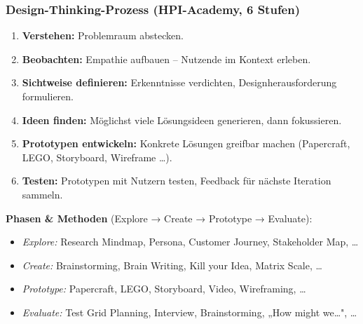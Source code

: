 \documentclass[12pt, a4paper]{article}
\begin{document}
\subsubsection*{Design-Thinking-Prozess (HPI-Academy, 6 Stufen)}

\begin{enumerate}
  \item \textbf{Verstehen:} Problemraum abstecken.
  \item \textbf{Beobachten:} Empathie aufbauen -- Nutzende im Kontext erleben.
  \item \textbf{Sichtweise definieren:} Erkenntnisse verdichten, Designherausforderung formulieren.
  \item \textbf{Ideen finden:} Möglichst viele Lösungsideen generieren, dann fokussieren.
  \item \textbf{Prototypen entwickeln:} Konkrete Lösungen greifbar machen (Papercraft, LEGO, Storyboard, Wireframe \dots).
  \item \textbf{Testen:} Prototypen mit Nutzern testen, Feedback für nächste Iteration sammeln.
\end{enumerate}

\textbf{Phasen \& Methoden} (Explore → Create → Prototype → Evaluate):
\begin{itemize}
  \item \textit{Explore:} Research Mindmap, Persona, Customer Journey, Stakeholder Map, \dots
  \item \textit{Create:} Brainstorming, Brain Writing, Kill your Idea, Matrix Scale, \dots
  \item \textit{Prototype:} Papercraft, LEGO, Storyboard, Video, Wireframing, \dots
  \item \textit{Evaluate:} Test Grid Planning, Interview, Brainstorming, „How might we\dots", \dots
\end{itemize}
\end{document}
